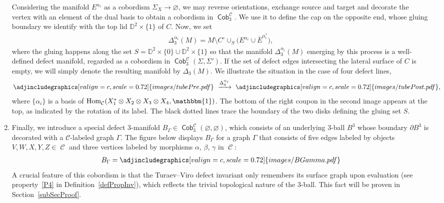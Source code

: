 \documentclass[pdftex]{sigma}
\DeclareMathOperator{\Hom}{Hom}
\DeclareMathOperator{\Cob}{\mathsf{Cob}}
\DeclareMathOperator{\calc}{\mathcal{C}}
\numberwithin{equation}{section}
\theoremstyle{definition}
\begin{document}
\begin{enumerate}
 Considering the manifold $E^{\alpha_i}$ as a cobordism $\Sigma_X \rightarrow \varnothing $, we may reverse orientations, exchange source and target and decorate the vertex with an element of the dual basis \smash{$\{\alpha_i^*\} \subset \Hom_{\mathcal{C}}\bigl(\mathbbm{1}, X_1^{\varepsilon(1)} \otimes \dots \otimes X_n^{\varepsilon(n)}\bigr)$} to obtain a cobordism  in $\Cob_3^{\calc}$. We use it to define the cap on the opposite end, whose gluing boundary we identify with the top lid $\mathbb{D}^2 \times \{1\}$ of $C$. Now, we set
 \begin{align}
 \label{eqMovTube}
 \Delta_3^{\alpha_i}(M) = M \setminus C^{\circ} \cup_S \bigl(E^{\alpha_i} \cup \overline{E}^{\alpha_i^*}\bigr),
 \end{align}
 where the gluing happens along the set $S = \mathbb{D}^2 \times \{0\} \cup \mathbb{D}^2 \times \{1\}$ so that the manifold $\Delta_3^{\alpha_i}(M)$ emerging by this process is a well-defined defect manifold, regarded as a cobordism in $\Cob_3^{\calc}(\Sigma, \Sigma')$. If the set of defect edges intersecting the lateral surface of $C$ is empty, we will simply denote the resulting manifold by $\Delta_3(M)$. We illustrate the situation in the case of four defect lines,
 \begin{align*}
 \adjincludegraphics[valign=c, scale = 0.72]{images/tubePre.pdf} \,\, \xrightarrow{\Delta_3^{\alpha_i}} \,\, \adjincludegraphics[valign=c, scale = 0.72]{images/tubePost.pdf},
 \end{align*}
 where $\{\alpha_i\}$ is a basis of $\Hom_{\calc}(X_1^* \otimes X_2 \otimes X_3 \otimes X_4, \mathbbm{1})$. The bottom of the right coupon in the second image appears at the top, as indicated by the rotation of its label. The black dotted lines trace the boundary of the two disks defining the gluing set $S$.
 \item Finally, we introduce a special defect 3-manifold $B_{\Gamma} \in \Cob_3^{\calc}(\varnothing, \varnothing)$, which consists of an underlying 3-ball $B^3$ whose boundary $\partial B^3$ is decorated with a $\mathcal{C}$-labeled graph $\Gamma$. The figure below displays $B_{\Gamma}$ for a graph $\Gamma$ that consists of five edges labeled by objects $V, W, X, Y, Z \in \calc$ and three vertices labeled by morphisms $\alpha$, $\beta$, $\gamma$ in $\calc$:
 \begin{align} \label{eqBGamma}
 B_{\Gamma} = \adjincludegraphics[valign=c, scale = 0.72]{images/BGamma.pdf}
 \end{align}
 A crucial feature of this cobordism is that the Turaev--Viro defect invariant only remembers its surface graph upon evaluation (see property~\ref{P4} in Definition~\ref{defPropInv}), which reflects the trivial topological nature of the 3-ball. This fact will be proven in Section~\ref{subSecProof}.
\end{enumerate}
\end{document}
